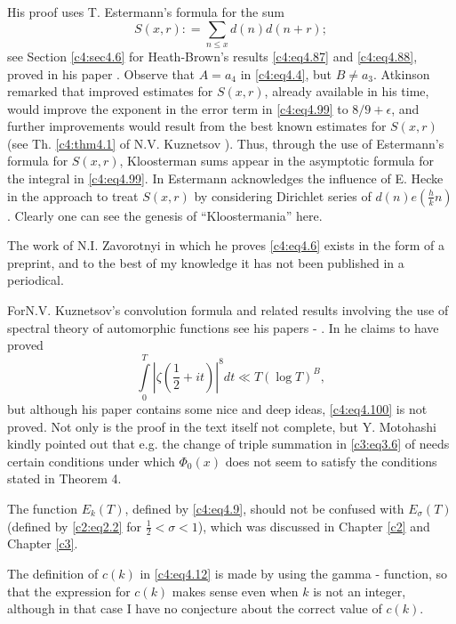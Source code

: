 His proof uses T. Estermann's formula \cite{Estermann2} for the sum 
$$
S(x, r): = \sum_{n \leq x} d(n) d(n+r);
$$
see Section \ref{c4:sec4.6} for Heath-Brown's results
\eqref{c4:eq4.87} and \eqref{c4:eq4.88}, proved in his paper
\cite{Heath-Brown3}. Observe that $A= a_4$ in \eqref{c4:eq4.4}, but $B \neq
a_3$. Atkinson remarked that improved estimates for $S (x, r)$,
already available in his time, would improve the exponent in the error
term in \eqref{c4:eq4.99} to $8/9 + \epsilon$, and further
improvements would result from the best known estimates for $S(x, r)$
(see Th. \ref{c4:thm4.1} of N.V. Kuznetsov \cite{Kuznetsov4}). Thus, through the use of
Estermann's formula for $S(x, r)$, Kloosterman sums appear in the
asymptotic formula for the integral in \eqref{c4:eq4.99}. In \cite{Estermann2}
Estermann acknowledges the influence of E. Hecke in the approach to
treat $S(x, r)$ by considering Dirichlet series of $d(n)
e\left(\frac{h}{k}n \right)$. Clearly one can see the genesis of
``Kloostermania'' here.

The work of N.I. Zavorotnyi \cite{Zavorotnyi1} in which he proves
\eqref{c4:eq4.6} exists in the form of a preprint, and to the best of
my knowledge it has not been published in a periodical.

For\pageoriginale N.V. Kuznetsov's convolution formula and related
results involving the use of spectral theory of automorphic functions
see his papers \cite{Kuznetsov1} - \cite{Kuznetsov5}. In \cite{Kuznetsov5} he  claims to have proved
\begin{equation}
  \int\limits_0^T \left|\zeta \left(\frac{1}{2} + it\right)\right|^8 dt \ll T(\log
  T)^B,\label{c4:eq4.100} 
\end{equation}
but although his paper contains some nice and deep ideas,
\eqref{c4:eq4.100} is not proved. Not only is the proof in the text
itself not complete, but Y. Motohashi kindly pointed out that
e.g. the change of triple summation in \eqref{c3:eq3.6} of \cite{Motohashi5}
needs certain conditions under which $\Phi_0 (x)$ does not seem to
satisfy the conditions stated in Theorem 4.

The function $E_k (T)$, defined by \eqref{c4:eq4.9}, should not be
confused with $E_\sigma (T)$ (defined by \eqref{c2:eq2.2} for
$\frac{1}{2} < \sigma < 1$), which was discussed in Chapter \ref{c2} and
Chapter \ref{c3}.

The definition of $c(k)$ in \eqref{c4:eq4.12} is made by using the
gamma - function, so that the expression for $c(k)$ makes sense even
when $k$ is not an integer, although in that case I have no conjecture
about the correct value of $c(k)$.


